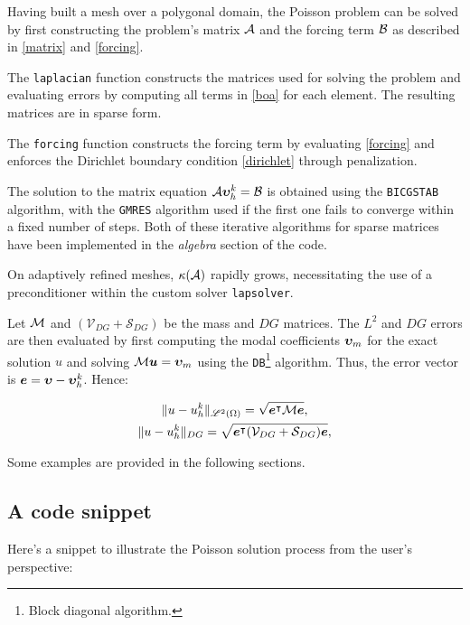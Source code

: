 Having built a mesh over a polygonal domain, the Poisson problem can be solved by first constructing the problem's matrix $\mathcal{A}$ and the forcing term $\mathcal{B}$ as described in \eqref{matrix} and \eqref{forcing}.

The \lstinline{laplacian} function constructs the matrices used for solving the problem and evaluating errors by computing all terms in \eqref{boa} for each element. The resulting matrices are in sparse form.

The \lstinline{forcing} function constructs the forcing term by evaluating \eqref{forcing} and enforces the Dirichlet boundary condition \eqref{dirichlet} through penalization.

\cite{Saad2003} The solution to the matrix equation $\mathcal{A} \bm{\upsilon}^k_h = \mathcal{B}$ is obtained using the \lstinline{BICGSTAB} algorithm, with the \lstinline{GMRES} algorithm used if the first one fails to converge within a fixed number of steps. Both of these iterative algorithms for sparse matrices have been implemented in the \textit{algebra} section of the code.

On adaptively refined meshes, $\kappa(\mathcal{A})$ rapidly grows, necessitating the use of a preconditioner within the custom solver \lstinline{lapsolver}.

Let $\mathcal{M}$ and $(\mathcal{V}_{DG} + \mathcal{S}_{DG})$ be the mass and $DG$ matrices. The $L^2$ and $DG$ errors are then evaluated by first computing the modal coefficients $\bm{\upsilon}_m$ for the exact solution $u$ and solving $\mathcal{M} \bm{u} = \bm{\upsilon}_m$ using the \lstinline{DB}\footnote{Block diagonal algorithm.} algorithm. Thus, the error vector is $\bm{e} = \bm{\upsilon} - \bm{\upsilon}^k_h$. Hence:

\begin{gather}
    \lVert u - u^k_h \rVert_{\mathscr{L}^2(\Omega)} = \sqrt{\bm{e}^\intercal \mathcal{M} \bm{e}}, \\
    \lVert u - u^k_h \rVert_{DG} = \sqrt{\bm{e}^\intercal (\mathcal{V}_{DG} + \mathcal{S}_{DG}) \bm{e}},
\end{gather}

Some examples are provided in the following sections.

\newpage
\subsection{A code snippet}

Here's a snippet to illustrate the Poisson solution process from the user's perspective:

